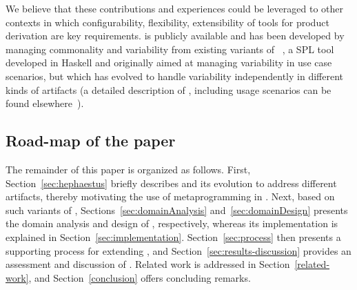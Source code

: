 We believe that these contributions and experiences could be leveraged to other contexts in which configurability, flexibility, extensibility of tools for product derivation are key requirements. \hpl{} is publicly available  and has been developed by managing commonality and variability from existing variants of \hp~\cite{rbonifacio:sbcars2009}, a SPL tool developed in Haskell and originally aimed at managing variability in use case scenarios, but which has evolved to handle variability independently in different kinds of artifacts (a detailed description of \hp, including usage scenarios can be found elsewhere~\cite{rbonifacio:sbcars2009}). 


\bigskip

\subsection*{Road-map of the paper}

The remainder of this paper is organized as follows. First, Section~\ref{sec:hephaestus} briefly describes \hp{} and its evolution to address different artifacts, thereby motivating the use of metaprogramming in \hpl. Next, based on such variants of \hp, Sections~\ref{sec:domainAnalysis} and~\ref{sec:domainDesign} presents the domain analysis and design of \hpl, respectively, whereas its implementation is explained in Section~\ref{sec:implementation}. Section~\ref{sec:process} then presents a supporting process for extending \hpl, and Section~\ref{sec:results-discussion} provides an assessment and discussion of \hpl. Related work is addressed in Section~\ref{related-work}, and Section~\ref{conclusion} offers concluding remarks.

